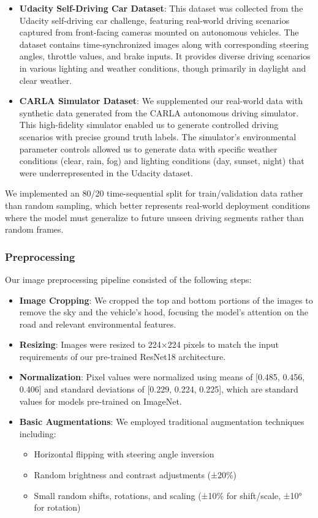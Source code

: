 \documentclass[pdflatex,sn-mathphys-num]{sn-jnl}%
\theoremstyle{thmstyleone}%
\theoremstyle{thmstyletwo}%
\theoremstyle{thmstylethree}%
\begin{document}
\begin{itemize}
\item \textbf{Udacity Self-Driving Car Dataset}: This dataset was collected from the Udacity self-driving car challenge, featuring real-world driving scenarios captured from front-facing cameras mounted on autonomous vehicles. The dataset contains time-synchronized images along with corresponding steering angles, throttle values, and brake inputs. It provides diverse driving scenarios in various lighting and weather conditions, though primarily in daylight and clear weather.

\item \textbf{CARLA Simulator Dataset}: We supplemented our real-world data with synthetic data generated from the CARLA autonomous driving simulator. This high-fidelity simulator enabled us to generate controlled driving scenarios with precise ground truth labels. The simulator's environmental parameter controls allowed us to generate data with specific weather conditions (clear, rain, fog) and lighting conditions (day, sunset, night) that were underrepresented in the Udacity dataset.
\end{itemize}

We implemented an 80/20 time-sequential split for train/validation data rather than random sampling, which better represents real-world deployment conditions where the model must generalize to future unseen driving segments rather than random frames.

\subsubsection{Preprocessing}
Our image preprocessing pipeline consisted of the following steps:
\begin{itemize}
\item \textbf{Image Cropping}: We cropped the top and bottom portions of the images to remove the sky and the vehicle's hood, focusing the model's attention on the road and relevant environmental features.
\item \textbf{Resizing}: Images were resized to 224×224 pixels to match the input requirements of our pre-trained ResNet18 architecture.
\item \textbf{Normalization}: Pixel values were normalized using means of [0.485, 0.456, 0.406] and standard deviations of [0.229, 0.224, 0.225], which are standard values for models pre-trained on ImageNet.
\item \textbf{Basic Augmentations}: We employed traditional augmentation techniques including:
  \begin{itemize}
  \item Horizontal flipping with steering angle inversion
  \item Random brightness and contrast adjustments (±20\%)
  \item Small random shifts, rotations, and scaling (±10\% for shift/scale, ±10° for rotation)
  \end{itemize}
\end{itemize}
\end{document}
